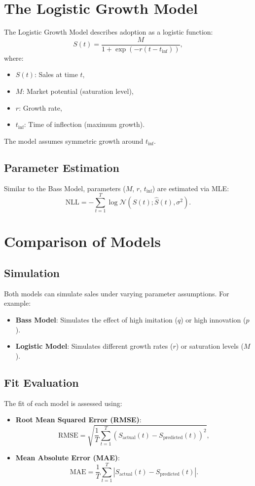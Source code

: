 \documentclass[12pt]{article}
\begin{document}
\section{The Logistic Growth Model}
The Logistic Growth Model describes adoption as a logistic function:
\[
S(t) = \frac{M}{1 + \exp(-r (t - t_{\text{inf}}))},
\]
where:
\begin{itemize}
    \item \(S(t)\): Sales at time \(t\),
    \item \(M\): Market potential (saturation level),
    \item \(r\): Growth rate,
    \item \(t_{\text{inf}}\): Time of inflection (maximum growth).
\end{itemize}
The model assumes symmetric growth around \(t_{\text{inf}}\).

\subsection{Parameter Estimation}
Similar to the Bass Model, parameters (\(M\), \(r\), \(t_{\text{inf}}\)) are estimated via MLE:
\[
\text{NLL} = -\sum_{t=1}^T \log \mathcal{N}(S(t); \hat{S}(t), \sigma^2).
\]

\section{Comparison of Models}
\subsection{Simulation}
Both models can simulate sales under varying parameter assumptions. For example:
\begin{itemize}
    \item \textbf{Bass Model}: Simulates the effect of high imitation (\(q\)) or high innovation (\(p\)).
    \item \textbf{Logistic Model}: Simulates different growth rates (\(r\)) or saturation levels (\(M\)).
\end{itemize}

\subsection{Fit Evaluation}
The fit of each model is assessed using:
\begin{itemize}
    \item \textbf{Root Mean Squared Error (RMSE)}:
    \[
    \text{RMSE} = \sqrt{\frac{1}{T} \sum_{t=1}^T (S_{\text{actual}}(t) - S_{\text{predicted}}(t))^2},
    \]
    \item \textbf{Mean Absolute Error (MAE)}:
    \[
    \text{MAE} = \frac{1}{T} \sum_{t=1}^T \left| S_{\text{actual}}(t) - S_{\text{predicted}}(t) \right|.
    \]
\end{itemize}
\end{document}
